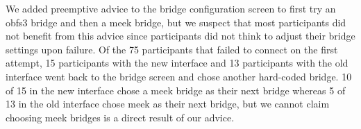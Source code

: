 \documentclass[USenglish,oneside,twocolumn]{article}
\begin{document}
{%
%
%

We added preemptive advice to the bridge configuration screen to first try an obfs3 bridge and then a meek bridge, but we suspect that most participants did not benefit from this advice since participants did not think to adjust their bridge settings upon failure. Of the 75 participants that failed to connect on the first attempt, 15 participants with the new interface and 13 participants with the old interface went back to the bridge screen and chose another hard-coded bridge. 10 of 15 in the new interface chose a meek bridge as their next bridge whereas 5 of 13 in the old interface chose meek as their next bridge, but we cannot claim choosing meek bridges is a direct result of our advice.

}
\end{document}

